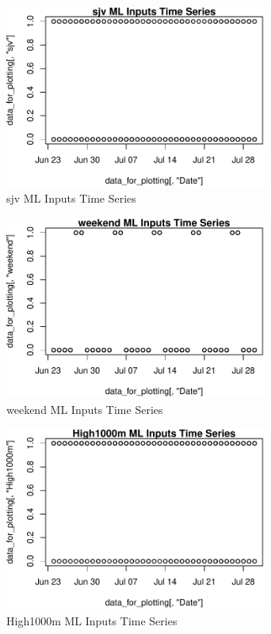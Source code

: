 \begin{figure} 
\centering  
\includegraphics[width=0.77\textwidth]{Code_Outputs/ML_input_report_AllforCaret_cleaned_StepPractice_part_practice_sjvTS.pdf} 
\caption{\label{fig:ML_input_report_AllforCaret_cleaned_StepPractice_part_practicesjvTS}sjv ML Inputs Time Series} 
\end{figure} 
 

\begin{figure} 
\centering  
\includegraphics[width=0.77\textwidth]{Code_Outputs/ML_input_report_AllforCaret_cleaned_StepPractice_part_practice_weekendTS.pdf} 
\caption{\label{fig:ML_input_report_AllforCaret_cleaned_StepPractice_part_practiceweekendTS}weekend ML Inputs Time Series} 
\end{figure} 
 

\begin{figure} 
\centering  
\includegraphics[width=0.77\textwidth]{Code_Outputs/ML_input_report_AllforCaret_cleaned_StepPractice_part_practice_High1000mTS.pdf} 
\caption{\label{fig:ML_input_report_AllforCaret_cleaned_StepPractice_part_practiceHigh1000mTS}High1000m ML Inputs Time Series} 
\end{figure} 
 

